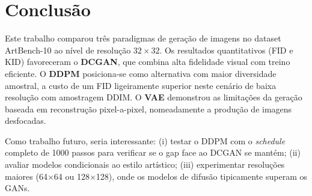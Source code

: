 \documentclass[12pt,a4paper]{article}
\begin{document}
\section{Conclusão}

Este trabalho comparou três paradigmas de geração de imagens no dataset ArtBench-10
ao nível de resolução $32\times32$. Os resultados quantitativos (FID e KID)
favoreceram o \textbf{DCGAN}, que combina alta fidelidade visual com treino eficiente.
O \textbf{DDPM} posiciona-se como alternativa com maior diversidade amostral, a
custo de um FID ligeiramente superior neste cenário de baixa resolução com
amostragem DDIM. O \textbf{VAE} demonstrou as limitações da geração baseada em
reconstrução pixel-a-pixel, nomeadamente a produção de imagens desfocadas.

Como trabalho futuro, seria interessante: (i) testar o DDPM com o \textit{schedule}
completo de 1000 passos para verificar se o gap face ao DCGAN se mantém;
(ii) avaliar modelos condicionais ao estilo artístico; (iii) experimentar
resoluções maiores (64$\times$64 ou 128$\times$128), onde os modelos de difusão
tipicamente superam os GANs.
\end{document}
